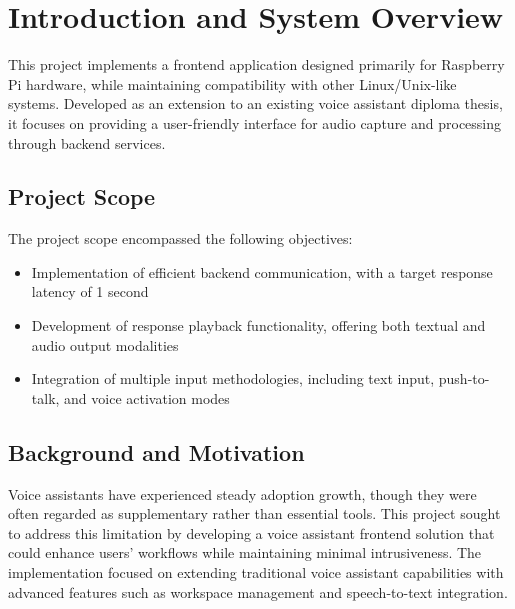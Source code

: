 \renewcommand*\chapterpagestyle{scrheadings}
\chapter{Introduction and System Overview}

This project implements a frontend application designed primarily for Raspberry Pi hardware,
while maintaining compatibility with other Linux/Unix-like systems.
Developed as an extension to an existing voice assistant diploma thesis,
it focuses on providing a user-friendly interface for audio capture and processing through backend services.

\section{Project Scope}
The project scope encompassed the following objectives:
\begin{itemize}
    \item Implementation of efficient backend communication, with a target response latency of 1 second
    \item Development of response playback functionality, offering both textual and audio output modalities
    \item Integration of multiple input methodologies, including text input, push-to-talk, and voice activation modes
\end{itemize}


\section{Background and Motivation}
Voice assistants have experienced steady adoption growth,
though they were often regarded as supplementary rather than essential tools.
This project sought to address this limitation
by developing a voice assistant frontend solution that could enhance users' workflows
while maintaining minimal intrusiveness.
The implementation focused on extending traditional voice assistant capabilities
with advanced features such as workspace management and speech-to-text integration.

